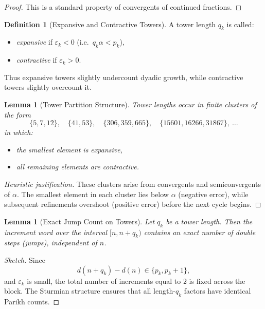 \documentclass[12pt, oneside]{article}
\numberwithin{equation}{section}
\theoremstyle{definition}
\newtheorem{definition}{Definition}[section]
\theoremstyle{plain}
\newtheorem{lemma}[theorem]{Lemma}
\theoremstyle{remark}
\begin{document}
\begin{proof}
This is a standard property of convergents of continued fractions.
\end{proof}


\begin{definition}[Expansive and Contractive Towers]
A tower length $q_k$ is called:
\begin{itemize}
\item \emph{expansive} if $\varepsilon_k < 0$ (i.e.\ $q_k\alpha < p_k$),
\item \emph{contractive} if $\varepsilon_k > 0$.
\end{itemize}
\end{definition}

Thus expansive towers slightly undercount dyadic growth, while
contractive towers slightly overcount it.


\begin{lemma}[Tower Partition Structure]
\label{lem:tower-partition}
Tower lengths occur in finite clusters of the form
\[
\{5,7,12\},\quad
\{41,53\},\quad
\{306,359,665\},\quad
\{15601,16266,31867\},\ \dots
\]
in which:
\begin{itemize}
\item the smallest element is expansive,
\item all remaining elements are contractive.
\end{itemize}
\end{lemma}

\begin{proof}[Heuristic justification]
These clusters arise from convergents and semiconvergents of $\alpha$.
The smallest element in each cluster lies below $\alpha$ (negative error),
while subsequent refinements overshoot (positive error) before the next
cycle begins.
\end{proof}


\begin{lemma}[Exact Jump Count on Towers]
\label{lem:exact-jumps}
Let $q_k$ be a tower length.  Then the increment word over the interval
$[n,n+q_k)$ contains an exact number of double steps (jumps), independent
of $n$.
\end{lemma}

\begin{proof}[Sketch]
Since
\[
d(n+q_k)-d(n) \in \{p_k, p_k+1\},
\]
and $\varepsilon_k$ is small, the total number of increments equal to $2$
is fixed across the block.  The Sturmian structure ensures that all
length-$q_k$ factors have identical Parikh counts.
\end{proof}
\end{document}
